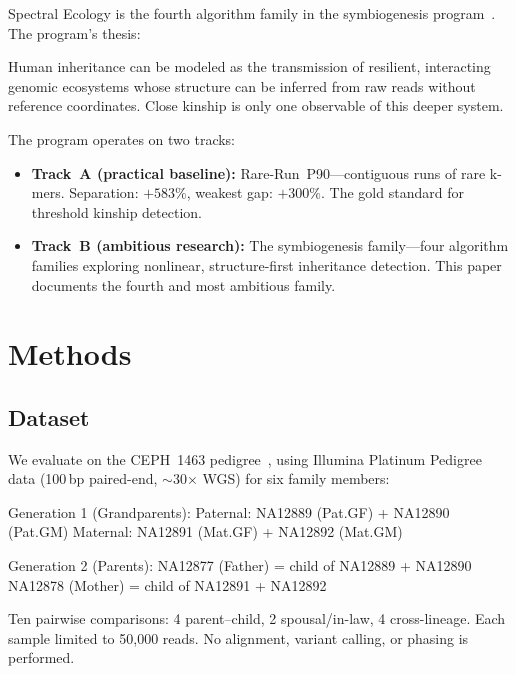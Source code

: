 \documentclass{../yalumba}
\begin{document}
Spectral Ecology is the fourth algorithm family in the symbiogenesis
program~\cite{margulis1998}.  The program's thesis:

\begin{definition}
Human inheritance can be modeled as the transmission of resilient, interacting
genomic ecosystems whose structure can be inferred from raw reads without
reference coordinates.  Close kinship is only one observable of this deeper
system.
\end{definition}

The program operates on two tracks:

\begin{itemize}
  \item \textbf{Track~A (practical baseline):} Rare-Run~P90---contiguous runs
    of rare k-mers.  Separation: $+583\%$, weakest gap: $+300\%$.  The gold
    standard for threshold kinship detection.
  \item \textbf{Track~B (ambitious research):} The symbiogenesis family---four
    algorithm families exploring nonlinear, structure-first inheritance
    detection.  This paper documents the fourth and most ambitious family.
\end{itemize}


\section{Methods}
\label{sec:methods}

\subsection{Dataset}

We evaluate on the CEPH~1463 pedigree~\cite{ceph1463, zook2019giab,
1000genomes2015}, using Illumina Platinum Pedigree data (100\,bp paired-end,
$\sim$30$\times$ WGS) for six family members:

\begin{pedigree}
Generation 1 (Grandparents):
  Paternal: NA12889 (Pat.GF) + NA12890 (Pat.GM)
  Maternal: NA12891 (Mat.GF) + NA12892 (Mat.GM)

Generation 2 (Parents):
  NA12877 (Father) = child of NA12889 + NA12890
  NA12878 (Mother) = child of NA12891 + NA12892
\end{pedigree}

Ten pairwise comparisons: 4 parent--child, 2 spousal/in-law, 4 cross-lineage.
Each sample limited to 50{,}000 reads.  No alignment, variant calling, or
phasing is performed.
\end{document}
